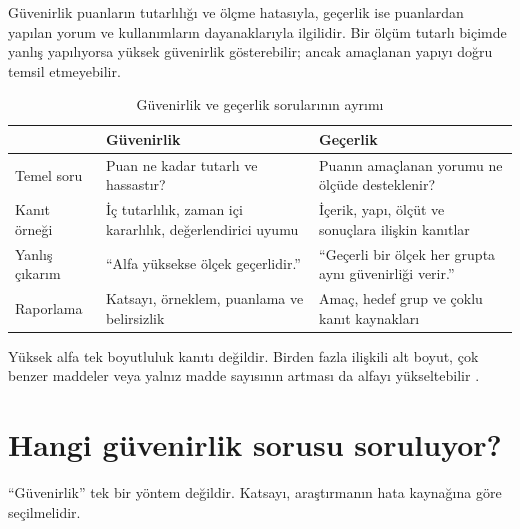 Güvenirlik puanların tutarlılığı ve ölçme hatasıyla, geçerlik ise puanlardan
yapılan yorum ve kullanımların dayanaklarıyla ilgilidir. Bir ölçüm tutarlı
biçimde yanlış yapılıyorsa yüksek güvenirlik gösterebilir; ancak amaçlanan
yapıyı doğru temsil etmeyebilir.

\begin{table}[htbp]
\centering
\caption{Güvenirlik ve geçerlik sorularının ayrımı}
\label{tab:reliability-validity}
\begin{tabular}{@{}p{}p{}p{}@{}}
\toprule
 & Güvenirlik & Geçerlik \\
\midrule
Temel soru & Puan ne kadar tutarlı ve hassastır? & Puanın amaçlanan yorumu ne ölçüde desteklenir? \\
Kanıt örneği & İç tutarlılık, zaman içi kararlılık, değerlendirici uyumu & İçerik, yapı, ölçüt ve sonuçlara ilişkin kanıtlar \\
Yanlış çıkarım & ``Alfa yüksekse ölçek geçerlidir.'' & ``Geçerli bir ölçek her grupta aynı güvenirliği verir.'' \\
Raporlama & Katsayı, örneklem, puanlama ve belirsizlik & Amaç, hedef grup ve çoklu kanıt kaynakları \\
\bottomrule
\end{tabular}
\end{table}

\begin{mistakebox}
Yüksek alfa tek boyutluluk kanıtı değildir. Birden fazla ilişkili alt boyut,
çok benzer maddeler veya yalnız madde sayısının artması da alfayı yükseltebilir
\citep{sijtsma2009,mcneish2018}.
\end{mistakebox}

\section{Hangi güvenirlik sorusu soruluyor?}

``Güvenirlik'' tek bir yöntem değildir. Katsayı, araştırmanın hata kaynağına
göre seçilmelidir.

